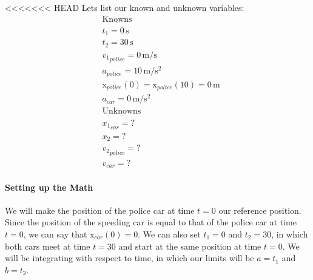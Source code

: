 \documentclass{article}
\newcommand{\x}{\mathrm{x}}
\begin{document}
\begin{figure}[hh]
\begin{center}
	\end{center}
    \end{figure}

<<<<<<< HEAD
	Lets list our known and unknown variables:
	\begin{align*}
		&\mathrm{\underline{Knowns}}\\
		&t_1 =0\,\mathrm{s} \\
		&t_2 = 30\,\mathrm{s} \\
		&{v_1}_{police} =0\,\mathrm{m/s} \\
		&a_{police} =10\,\mathrm{m/s^2}\\
		&\x_{police}(0) = \x_{police}(10) = 0\,\mathrm{m}\\
		&a_{car} =0\,\mathrm{m/s^2}\\
		&\mathrm{\underline{Unknowns}}\\
		&{x_1}_{car} = ?\\
		&x_2 = ?\\
		&{v_2}_{police} = ?\\
		&{v}_{car} = ?
	\end{align*}

	\paragraph{Setting up the Math} We will make the position of the police car at time $t=0$ our
	reference position. Since the position of the speeding car is equal to that of the police car at 
	time $t=0$, we can say that $\x_{car}(0)=0$. We can also set $t_1=0$ and $t_2=30$, in which both cars
	meet at time $t=30$ and start at the same position at time $t=0$. We will be integrating with respect to 
	time, in which our limits will be $a=t_1$ and $b=t_2$.
\end{document}
